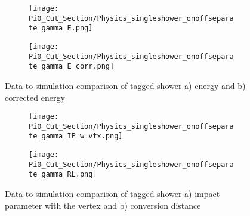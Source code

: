 \begin{figure}[H]
\centering
  \begin{subfigure}[t]{0.3\textwidth}
    \centering
\texttt{[image: Pi0\_Cut\_Section/Physics\_singleshower\_onoffseparate\_gamma\_E.png]}
  \caption{ }
  \end{subfigure} 
  \hspace{30mm}
  \begin{subfigure}[t]{0.3\textwidth}
    \centering
\texttt{[image: Pi0\_Cut\_Section/Physics\_singleshower\_onoffseparate\_gamma\_E\_corr.png]}
  \caption{ }
  \end{subfigure} 
\caption{ Data to simulation comparison of tagged shower a) energy and b) corrected energy }
\label{fig:physics_singleshower_e}
\end{figure}

\begin{figure}[H]
\centering
  \begin{subfigure}[t]{0.3\textwidth}
    \centering
\texttt{[image: Pi0\_Cut\_Section/Physics\_singleshower\_onoffseparate\_gamma\_IP\_w\_vtx.png]}
  \caption{ }
  \end{subfigure} 
  \hspace{20mm}
  \begin{subfigure}[t]{0.3\textwidth}
    \centering
\texttt{[image: Pi0\_Cut\_Section/Physics\_singleshower\_onoffseparate\_gamma\_RL.png]}
  \caption{ }
  \end{subfigure} 
\caption{ Data to simulation comparison of tagged shower a) impact parameter with the vertex and b) conversion distance }
\label{fig:physics_singleshower_ip}
\end{figure}

